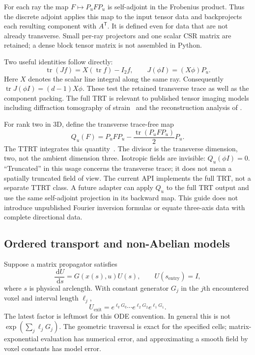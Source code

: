 \documentclass[11pt,a4paper]{article}
\newcommand{\dd}{\,\mathrm{d}}
\newcommand{\tr}{\operatorname{tr}}
\begin{document}
For each ray the map $F\mapsto P_uFP_u$ is self-adjoint in the Frobenius
product. Thus the discrete adjoint applies this map to the input tensor
data and backprojects each resulting component with $A^\mathsf{T}$.
It is defined even for data that are not already transverse. Small
per-ray projectors and one scalar CSR matrix are retained; a dense block
tensor matrix is not assembled in Python.

Two useful identities follow directly:
\begin{equation}
 \tr(Jf)=X(\tr f)-I_2f,
 \qquad
 J(\phi I)=(X\phi)P_u.
 \label{eq:trace}
\end{equation}
Here $X$ denotes the scalar line integral along the same ray. Consequently
$\tr J(\phi I)=(d-1)X\phi$. These test the retained transverse trace as well
as the component packing. The full TRT is relevant to published tensor
imaging models including diffraction tomography of strain~\cite{lionheart2015}
and the reconstruction analysis of \citet{desai2016}.

For rank two in 3D, define the transverse trace-free map
\begin{equation}
 Q_u(F)=P_uFP_u-\frac{\tr(P_uFP_u)}{2}P_u.
 \label{eq:ttrt}
\end{equation}
The TTRT integrates this quantity~\cite{szotten2006,lionheart2009}.
The divisor is the transverse dimension, two, not the ambient dimension
three. Isotropic fields are invisible: $Q_u(\phi I)=0$.
``Truncated'' in this usage concerns the transverse trace; it does not
mean a spatially truncated field of view. The current API implements the
full TRT, not a separate TTRT class. A future adapter can apply $Q_u$ to
the full TRT output and use the same self-adjoint projection in its
backward map. This guide does not introduce unpublished Fourier inversion
formulas or equate three-axis data with complete directional data.

\subsection{Ordered transport and non-Abelian models}
\label{sec:transport}
Suppose a matrix propagator satisfies
\begin{equation}
 \frac{\dd U}{\dd s}=G(x(s),u)U(s),\qquad U(s_{\mathrm{entry}})=I,
\end{equation}
where $s$ is physical arclength. With constant generator $G_j$ in the
$j$th encountered voxel and interval length $\ell_j$,
\begin{equation}
 U_{\mathrm{exit}}=
 e^{\ell_q G_q}\cdots e^{\ell_2 G_2}e^{\ell_1 G_1}.
 \label{eq:product}
\end{equation}
The latest factor is leftmost for this ODE convention. In general this is
not $\exp(\sum_j\ell_jG_j)$. The geometric traversal is exact for the
specified cells; matrix-exponential evaluation has numerical error, and
approximating a smooth field by voxel constants has model error.
\end{document}
